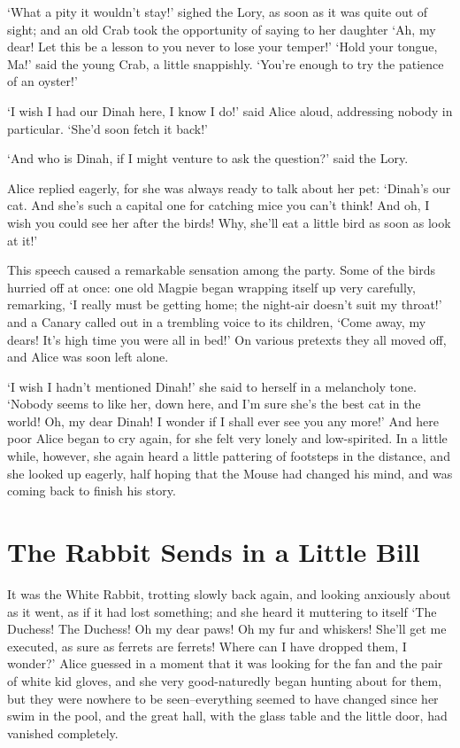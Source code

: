 \documentclass[statementpaper,twoside,openany]{memoir}
\begin{document}
`What a pity it wouldn't stay!' sighed the Lory, as soon as it was quite out of sight; and an old Crab took the opportunity of saying to her daughter `Ah, my dear! Let this be a lesson to you never to lose your temper!' `Hold your tongue, Ma!' said the young Crab, a little snappishly. `You're enough to try the patience of an oyster!'

`I wish I had our Dinah here, I know I do!' said Alice aloud, addressing nobody in particular. `She'd soon fetch it back!'

`And who is Dinah, if I might venture to ask the question?' said the Lory.

Alice replied eagerly, for she was always ready to talk about her pet: `Dinah's our cat. And she's such a capital one for catching mice you can't think! And oh, I wish you could see her after the birds! Why, she'll eat a little bird as soon as look at it!'

This speech caused a remarkable sensation among the party. Some of the birds hurried off at once: one old Magpie began wrapping itself up very carefully, remarking, `I really must be getting home; the night-air doesn't suit my throat!' and a Canary called out in a trembling voice to its children, `Come away, my dears! It's high time you were all in bed!' On various pretexts they all moved off, and Alice was soon left alone.

`I wish I hadn't mentioned Dinah!' she said to herself in a melancholy tone. `Nobody seems to like her, down here, and I'm sure she's the best cat in the world! Oh, my dear Dinah! I wonder if I shall ever see you any more!' And here poor Alice began to cry again, for she felt very lonely and low-spirited. In a little while, however, she again heard a little pattering of footsteps in the distance, and she looked up eagerly, half hoping that the Mouse had changed his mind, and was coming back to finish his story.

\chapter{The Rabbit Sends in a Little Bill}

It was the White Rabbit, trotting slowly back again, and looking anxiously about as it went, as if it had lost something; and she heard it muttering to itself `The Duchess! The Duchess! Oh my dear paws! Oh my fur and whiskers! She'll get me executed, as sure as ferrets are ferrets! Where can I have dropped them, I wonder?' Alice guessed in a moment that it was looking for the fan and the pair of white kid gloves, and she very good-naturedly began hunting about for them, but they were nowhere to be seen--everything seemed to have changed since her swim in the pool, and the great hall, with the glass table and the little door, had vanished completely.
\end{document}
